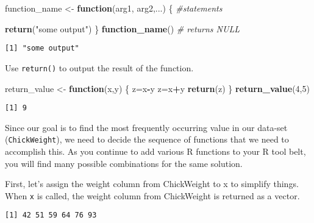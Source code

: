 \documentclass[12pt,]{article}
\newenvironment{Shaded}{\begin{snugshade}}{\end{snugshade}}
\newcommand{\KeywordTok}[1]{\textcolor[rgb]{0.13,0.29,0.53}{\textbf{#1}}}
\newcommand{\DecValTok}[1]{\textcolor[rgb]{0.00,0.00,0.81}{#1}}
\newcommand{\StringTok}[1]{\textcolor[rgb]{0.31,0.60,0.02}{#1}}
\newcommand{\CommentTok}[1]{\textcolor[rgb]{0.56,0.35,0.01}{\textit{#1}}}
\newcommand{\ControlFlowTok}[1]{\textcolor[rgb]{0.13,0.29,0.53}{\textbf{#1}}}
\newcommand{\OperatorTok}[1]{\textcolor[rgb]{0.81,0.36,0.00}{\textbf{#1}}}
\newcommand{\NormalTok}[1]{#1}
\theoremstyle{definition}
\theoremstyle{definition}
\theoremstyle{definition}
\theoremstyle{remark}
\begin{document}
\begin{Shaded}
\begin{Highlighting}[]
\NormalTok{function_name <-}\StringTok{ }\ControlFlowTok{function}\NormalTok{(arg1, arg2,...) \{}
  \CommentTok{#statements}
  
  \KeywordTok{return}\NormalTok{(}\StringTok{"some output"}\NormalTok{)}
\NormalTok{\}}
\KeywordTok{function_name}\NormalTok{() }\CommentTok{# returns NULL}
\end{Highlighting}
\end{Shaded}

\begin{verbatim}
[1] "some output"
\end{verbatim}

Use \texttt{return()} to output the result of the function.

\begin{Shaded}
\begin{Highlighting}[]
\NormalTok{return_value <-}\StringTok{ }\ControlFlowTok{function}\NormalTok{(x,y) \{}
\NormalTok{  z=x}\OperatorTok{-}\NormalTok{y  }
\NormalTok{  z=x}\OperatorTok{+}\NormalTok{y}
  \KeywordTok{return}\NormalTok{(z)}
\NormalTok{\}}
\KeywordTok{return_value}\NormalTok{(}\DecValTok{4}\NormalTok{,}\DecValTok{5}\NormalTok{) }
\end{Highlighting}
\end{Shaded}

\begin{verbatim}
[1] 9
\end{verbatim}

Since our goal is to find the most frequently occurring value in our
data-set (\texttt{ChickWeight}), we need to decide the sequence of
functions that we need to accomplish this. As you continue to add
various R functions to your R tool belt, you will find many possible
combinations for the same solution.

First, let's assign the weight column from ChickWeight to x to simplify
things. When \texttt{x} is called, the weight column from ChickWeight is
returned as a vector.

\begin{Shaded}
\end{Shaded}

\begin{verbatim}
[1] 42 51 59 64 76 93
\end{verbatim}
\end{document}
